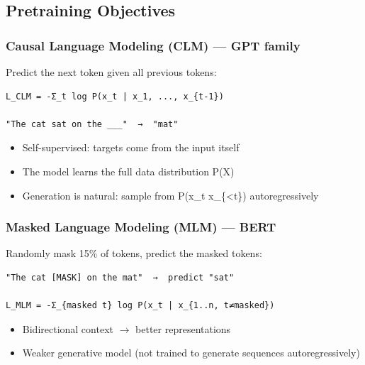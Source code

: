 \documentclass[11pt]{article}
\providecommand{\tightlist}{\setlength{\itemsep}{1pt}\setlength{\parskip}{0pt}}
\begin{document}
\subsection{Pretraining Objectives}\label{pretraining-objectives}

\subsubsection{Causal Language Modeling (CLM) --- GPT family}\label{causal-language-modeling-clm--gpt-family}

Predict the next token given all previous tokens:

\setcodelang{}

\begin{verbatim}
L_CLM = -Σ_t log P(x_t | x_1, ..., x_{t-1})

"The cat sat on the ___"  →  "mat"
\end{verbatim}

\begin{itemize}
\tightlist
\item
  Self-supervised: targets come from the input itself
\item
  The model learns the full data distribution P(X)
\item
  Generation is natural: sample from P(x\_t \textbar{} x\_\{\textless t\}) autoregressively
\end{itemize}

\subsubsection{Masked Language Modeling (MLM) --- BERT}\label{masked-language-modeling-mlm--bert}

Randomly mask 15\% of tokens, predict the masked tokens:

\setcodelang{}

\begin{verbatim}
"The cat [MASK] on the mat"  →  predict "sat"

L_MLM = -Σ_{masked t} log P(x_t | x_{1..n, t≠masked})
\end{verbatim}

\begin{itemize}
\tightlist
\item
  Bidirectional context \(\rightarrow\) better representations
\item
  Weaker generative model (not trained to generate sequences autoregressively)
\end{itemize}
\end{document}

